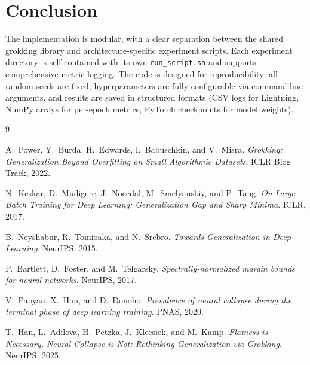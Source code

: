 \documentclass[11pt,a4paper]{article}
\theoremstyle{definition}
\begin{document}
\section{Conclusion}

The implementation is modular, with a clear separation between the shared grokking library
and architecture-specific experiment scripts. Each experiment directory is self-contained
with its own \texttt{run\_script.sh} and supports comprehensive metric logging. The code
is designed for reproducibility: all random seeds are fixed, hyperparameters are fully
configurable via command-line arguments, and results are saved in structured formats
(CSV logs for Lightning, NumPy arrays for per-epoch metrics, PyTorch checkpoints for
model weights).


\begin{thebibliography}{9}

A.~Power, Y.~Burda, H.~Edwards, I.~Babuschkin, and V.~Misra.
\emph{Grokking: Generalization Beyond Overfitting on Small Algorithmic Datasets}.
ICLR Blog Track, 2022.

N.~Keskar, D.~Mudigere, J.~Nocedal, M.~Smelyanskiy, and P.~Tang.
\emph{On Large-Batch Training for Deep Learning: Generalization Gap and Sharp Minima}.
ICLR, 2017.

B.~Neyshabur, R.~Tomioaka, and N.~Srebro.
\emph{Towards Generalization in Deep Learning}.
NeurIPS, 2015.

P.~Bartlett, D.~Foster, and M.~Telgarsky.
\emph{Spectrally-normalized margin bounds for neural networks}.
NeurIPS, 2017.

V.~Papyan, X.~Han, and D.~Donoho.
\emph{Prevalence of neural collapse during the terminal phase of deep learning training}.
PNAS, 2020.

T.~Han, L.~Adilova, H.~Petzka, J.~Kleesiek, and M.~Kamp.
\emph{Flatness is Necessary, Neural Collapse is Not: Rethinking Generalization via Grokking}.
NeurIPS, 2025.

\end{thebibliography}
\end{document}

